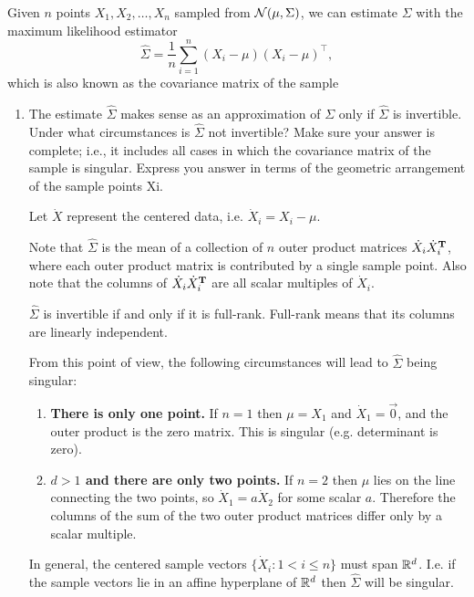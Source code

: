\noindent
Given $n$ points $X_1, X_2, \ldots, X_n$ sampled from $\mathcal{N}(\mu, \Sigma)$, we can estimate $\Sigma$ with the maximum likelihood estimator
$$ \hat{\Sigma} = \frac{1}{n} \sum_{i=1}^n (X_i - \mu)(X_i - \mu)^{\top},$$ which is also known as the covariance matrix of the sample
\begin{enumerate}[label=(\alph*)]
\item The estimate $\hat{\Sigma}$ makes sense as an approximation of $\Sigma$
  only if $\hat{\Sigma}$ is invertible. Under what circumstances is
  $\hat{\Sigma}$ not invertible? Make sure your answer is complete; i.e., it
  includes all cases in which the covariance matrix of the sample is
  singular. Express you answer in terms of the geometric arrangement of the
  sample points Xi.
    \begin{mdframed}
      Let $\dot X$ represent the centered data, i.e. $\dot X_i = X_i - \mu$.

      Note that $\hat \Sigma$ is the mean of a collection of $n$ outer product
      matrices $\dot X_i \dot X_i^{\mathbf{T}}$, where each outer product matrix is
      contributed by a single sample point. Also note that the columns of
      $\dot X_i \dot X_i^{\mathbf{T}}$ are all scalar multiples of $\dot X_i$.

      $\hat \Sigma$ is invertible if and only if it is full-rank. Full-rank
      means that its columns are linearly independent.

      From this point of view, the following circumstances will lead to
      $\hat \Sigma$ being singular:

      \begin{enumerate}
      \item \textbf{There is only one point.} If $n = 1$ then $\mu = X_1$ and
        $\dot X_1 = \vec 0$, and the outer product is the zero matrix. This is
        singular (e.g. determinant is zero).
      \item \textbf{$d > 1$ and there are only two points.} If $n = 2$ then
        $\mu$ lies on the line connecting the two points, so
        $\dot X_1 = a\dot X_2$ for some scalar $a$. Therefore the columns of
        the sum of the two outer product matrices differ only by a scalar
        multiple.
      \end{enumerate}

      In general, the centered sample vectors $\{\dot X_i: 1 < i \leq n\}$ must
      span $\mathbb{R}^d$. I.e. if the sample vectors lie in an affine hyperplane of
      $\mathbb{R}^d$ then $\hat \Sigma$ will be singular.


\end{mdframed}
\end{enumerate}

